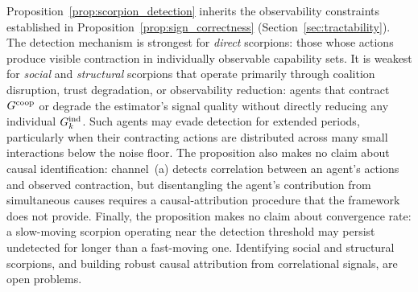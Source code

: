 \begin{remark}
\label{rem:detection_scope}
Proposition~\ref{prop:scorpion_detection} inherits the observability
    constraints established in Proposition~\ref{prop:sign_correctness}
    (Section~\ref{sec:tractability}). The detection mechanism is strongest for
    \emph{direct} scorpions: those whose actions produce visible contraction
    in individually observable capability sets. It is weakest for \emph{social}
    and \emph{structural} scorpions that operate primarily through coalition
    disruption, trust degradation, or observability reduction: agents that
    contract $G^{\mathrm{coop}}$ or degrade the estimator's signal quality without
    directly reducing any individual $G_{k}^{\mathrm{ind}}$. Such agents may evade
    detection for extended periods, particularly when their contracting actions
    are distributed across many small interactions below the noise floor. The
    proposition also makes no claim about causal identification: channel~(a)
    detects correlation between an agent's actions and observed contraction,
    but disentangling the agent's contribution from simultaneous causes
    requires a causal-attribution procedure that the framework does not
    provide. Finally, the proposition makes no claim about convergence rate: a
    slow-moving scorpion operating near the detection threshold may persist
    undetected for longer than a fast-moving one. Identifying social and
    structural scorpions, and building robust causal attribution from
    correlational signals, are open problems.
\end{remark}
